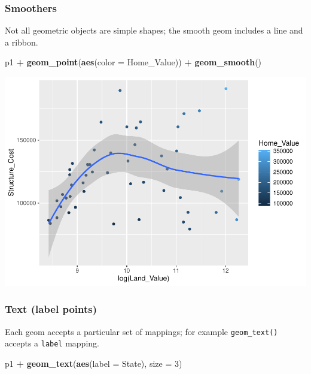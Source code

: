 \documentclass[
]{book}
\newenvironment{Shaded}{\begin{snugshade}}{\end{snugshade}}
\newcommand{\DataTypeTok}[1]{\textcolor[rgb]{0.13,0.29,0.53}{#1}}
\newcommand{\DecValTok}[1]{\textcolor[rgb]{0.00,0.00,0.81}{#1}}
\newcommand{\KeywordTok}[1]{\textcolor[rgb]{0.13,0.29,0.53}{\textbf{#1}}}
\newcommand{\NormalTok}[1]{#1}
\newcommand{\OperatorTok}[1]{\textcolor[rgb]{0.81,0.36,0.00}{\textbf{#1}}}
\newcommand{\StringTok}[1]{\textcolor[rgb]{0.31,0.60,0.02}{#1}}
\begin{document}
\hypertarget{smoothers}{%
\subsubsection{Smoothers}\label{smoothers}}

Not all geometric objects are simple shapes; the smooth geom includes a line and a ribbon.

\begin{Shaded}
\begin{Highlighting}[]
\NormalTok{p1 }\OperatorTok{+}
\StringTok{  }\KeywordTok{geom\_point}\NormalTok{(}\KeywordTok{aes}\NormalTok{(}\DataTypeTok{color =}\NormalTok{ Home\_Value)) }\OperatorTok{+}
\StringTok{  }\KeywordTok{geom\_smooth}\NormalTok{()}
\end{Highlighting}
\end{Shaded}

\includegraphics{R/Rgraphics/figures/unnamed-chunk-158-1.pdf}

\hypertarget{text-label-points}{%
\subsubsection{Text (label points)}\label{text-label-points}}

Each geom accepts a particular set of mappings; for example \texttt{geom\_text()} accepts a \texttt{label} mapping.

\begin{Shaded}
\begin{Highlighting}[]
\NormalTok{p1 }\OperatorTok{+}\StringTok{ }
\StringTok{  }\KeywordTok{geom\_text}\NormalTok{(}\KeywordTok{aes}\NormalTok{(}\DataTypeTok{label =}\NormalTok{ State), }\DataTypeTok{size =} \DecValTok{3}\NormalTok{)}
\end{Highlighting}
\end{Shaded}
\end{document}
